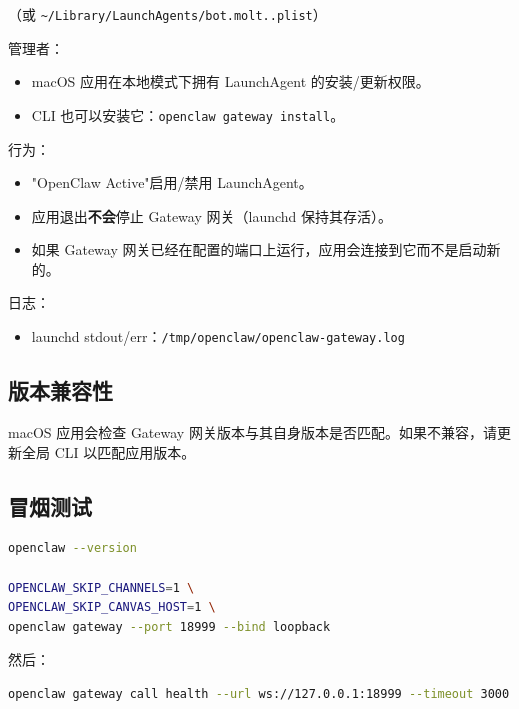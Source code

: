 （或 \texttt{\textasciitilde{}/Library/LaunchAgents/bot.molt..plist}）

管理者：

\begin{itemize}
  \item macOS 应用在本地模式下拥有 LaunchAgent 的安装/更新权限。
  \item CLI 也可以安装它：\texttt{openclaw gateway install}。
\end{itemize}


行为：

\begin{itemize}
  \item "OpenClaw Active"启用/禁用 LaunchAgent。
  \item 应用退出\textbf{不会}停止 Gateway 网关（launchd 保持其存活）。
  \item 如果 Gateway 网关已经在配置的端口上运行，应用会连接到它而不是启动新的。
\end{itemize}


日志：

\begin{itemize}
  \item launchd stdout/err：\texttt{/tmp/openclaw/openclaw-gateway.log}
\end{itemize}


\subsection{版本兼容性}


macOS 应用会检查 Gateway 网关版本与其自身版本是否匹配。如果不兼容，请更新全局 CLI 以匹配应用版本。

\subsection{冒烟测试}


\begin{lstlisting}[language=bash]
openclaw --version

OPENCLAW_SKIP_CHANNELS=1 \
OPENCLAW_SKIP_CANVAS_HOST=1 \
openclaw gateway --port 18999 --bind loopback
\end{lstlisting}


然后：

\begin{lstlisting}[language=bash]
openclaw gateway call health --url ws://127.0.0.1:18999 --timeout 3000
\end{lstlisting}



